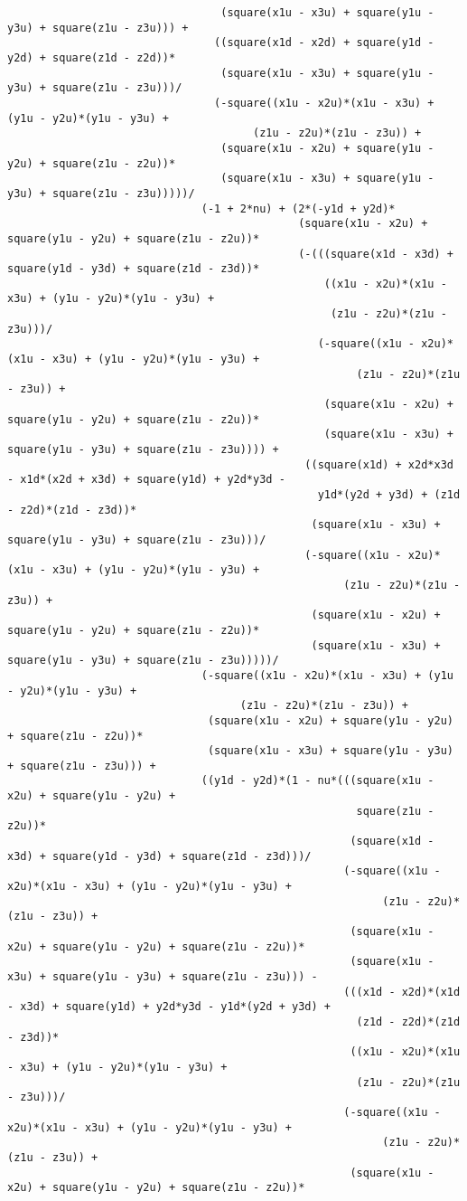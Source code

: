 \begin{lstlisting}
								 (square(x1u - x3u) + square(y1u - y3u) + square(z1u - z3u))) + 
								((square(x1d - x2d) + square(y1d - y2d) + square(z1d - z2d))*
								 (square(x1u - x3u) + square(y1u - y3u) + square(z1u - z3u)))/
								(-square((x1u - x2u)*(x1u - x3u) + (y1u - y2u)*(y1u - y3u) + 
									  (z1u - z2u)*(z1u - z3u)) + 
								 (square(x1u - x2u) + square(y1u - y2u) + square(z1u - z2u))*
								 (square(x1u - x3u) + square(y1u - y3u) + square(z1u - z3u)))))/
							  (-1 + 2*nu) + (2*(-y1d + y2d)*
											 (square(x1u - x2u) + square(y1u - y2u) + square(z1u - z2u))*
											 (-(((square(x1d - x3d) + square(y1d - y3d) + square(z1d - z3d))*
												 ((x1u - x2u)*(x1u - x3u) + (y1u - y2u)*(y1u - y3u) + 
												  (z1u - z2u)*(z1u - z3u)))/
												(-square((x1u - x2u)*(x1u - x3u) + (y1u - y2u)*(y1u - y3u) + 
													  (z1u - z2u)*(z1u - z3u)) + 
												 (square(x1u - x2u) + square(y1u - y2u) + square(z1u - z2u))*
												 (square(x1u - x3u) + square(y1u - y3u) + square(z1u - z3u)))) + 
											  ((square(x1d) + x2d*x3d - x1d*(x2d + x3d) + square(y1d) + y2d*y3d - 
												y1d*(y2d + y3d) + (z1d - z2d)*(z1d - z3d))*
											   (square(x1u - x3u) + square(y1u - y3u) + square(z1u - z3u)))/
											  (-square((x1u - x2u)*(x1u - x3u) + (y1u - y2u)*(y1u - y3u) + 
													(z1u - z2u)*(z1u - z3u)) + 
											   (square(x1u - x2u) + square(y1u - y2u) + square(z1u - z2u))*
											   (square(x1u - x3u) + square(y1u - y3u) + square(z1u - z3u)))))/
							  (-square((x1u - x2u)*(x1u - x3u) + (y1u - y2u)*(y1u - y3u) + 
									(z1u - z2u)*(z1u - z3u)) + 
							   (square(x1u - x2u) + square(y1u - y2u) + square(z1u - z2u))*
							   (square(x1u - x3u) + square(y1u - y3u) + square(z1u - z3u))) + 
							  ((y1d - y2d)*(1 - nu*(((square(x1u - x2u) + square(y1u - y2u) + 
													  square(z1u - z2u))*
													 (square(x1d - x3d) + square(y1d - y3d) + square(z1d - z3d)))/
													(-square((x1u - x2u)*(x1u - x3u) + (y1u - y2u)*(y1u - y3u) + 
														  (z1u - z2u)*(z1u - z3u)) + 
													 (square(x1u - x2u) + square(y1u - y2u) + square(z1u - z2u))*
													 (square(x1u - x3u) + square(y1u - y3u) + square(z1u - z3u))) - 
													(((x1d - x2d)*(x1d - x3d) + square(y1d) + y2d*y3d - y1d*(y2d + y3d) + 
													  (z1d - z2d)*(z1d - z3d))*
													 ((x1u - x2u)*(x1u - x3u) + (y1u - y2u)*(y1u - y3u) + 
													  (z1u - z2u)*(z1u - z3u)))/
													(-square((x1u - x2u)*(x1u - x3u) + (y1u - y2u)*(y1u - y3u) + 
														  (z1u - z2u)*(z1u - z3u)) + 
													 (square(x1u - x2u) + square(y1u - y2u) + square(z1u - z2u))*

\end{lstlisting}
